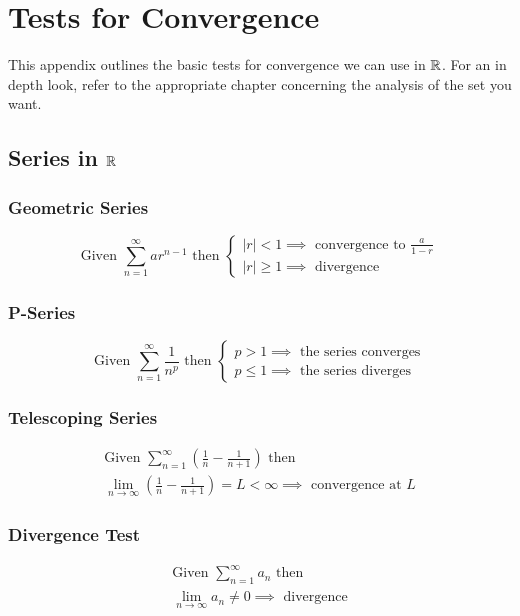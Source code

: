 \chapter{Tests for Convergence}
This appendix outlines the basic tests for convergence we can use in $\mathbb{R}$. For an in depth look, refer to the appropriate chapter concerning the analysis of the set you want.

\section{Series in $\mathbb{R}$}

\subsection*{Geometric Series}
\[
	\text{Given }\sum_{n=1}^{\infty}ar^{n-1}\text{ then }
	\begin{cases}
		|r| < 1 \implies \text{ convergence to } \frac{a}{1-r} \\
		|r| \geq 1 \implies \text{ divergence}
	\end{cases}
\]

\subsection*{P-Series}
\[
	\text{Given }\sum_{n=1}^{\infty}\frac{1}{n^{p}}\text{ then }
    \begin{cases}
        p > 1 \implies \text{ the series converges}\\
        p \leq 1 \implies \text{ the series diverges}
    \end{cases}
\]

\subsection*{Telescoping Series}
\begin{gather*}
    \text{Given }\sum_{n=1}^{\infty}\left(\frac{1}{n}-\frac{1}{n+1}\right)\text{ then}\\
    \lim_{n\to\infty}\left(\frac{1}{n}-\frac{1}{n+1}\right)=L <\infty\implies\text{ convergence at } L
\end{gather*}

\subsection*{Divergence Test}
\begin{gather*}
    \text{Given } \sum_{n=1}^{\infty}a_{n}\text{ then}\\
    \lim_{n\to\infty}a_{n}\neq0\implies\text{ divergence}
\end{gather*}


